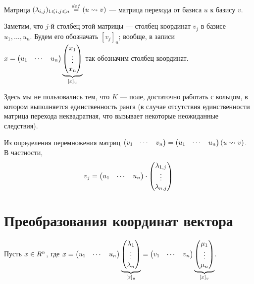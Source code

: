 \documentclass[a4paper]{report}
\begin{document}
    Матрица $(\lambda_{i,j})_{1 \leqslant i,j \leqslant n} \overset{def}{=} (u \rightsquigarrow v)$ --- матрица перехода от базиса $u$ к базису $v$.

    Заметим, что $j$-й столбец этой матрицы --- столбец координат $v_j$ в базисе $u_1, \dots, u_n$.
    Будем его обозначать $[v_j]_u$; вообще, в записи $x = \begin{pmatrix}u_1 & \cdots & u_n\end{pmatrix}\underbrace{\begin{pmatrix}x_1 \\ \vdots \\ x_n\end{pmatrix}}_{[x]_u}$ так обозначим столбец координат.

    Здесь мы не пользовались тем, что $K$ --- поле, достаточно работать с кольцом, в котором выполняется единственность ранга (в случае отсутствия единственности матрица перехода неквадратная, что вызывает некоторые неожиданные следствия).

    Из определения перемножения матриц $\begin{pmatrix}v_1 & \cdots & v_n\end{pmatrix} = \begin{pmatrix}u_1 & \cdots & u_n\end{pmatrix} (u \rightsquigarrow v)$.
    В частности, \[v_j = \begin{pmatrix}u_1 & \cdots & u_n\end{pmatrix}\cdot \begin{pmatrix}\lambda_{1, j} \\ \vdots \\ \lambda_{n,j}\end{pmatrix}\]



    \section{Преобразования координат вектора}
    Пусть $x \in \ind{}R{^n}$, где $x = \begin{pmatrix}u_1 & \cdots & u_n\end{pmatrix} \underbrace{\begin{pmatrix}\lambda_1 \\ \vdots \\ \lambda_n\end{pmatrix}}_{[x]_u} = \begin{pmatrix}v_1 & \cdots & v_n\end{pmatrix} \underbrace{\begin{pmatrix}\mu_1 \\ \vdots \\ \mu_n\end{pmatrix}}_{[x]_v}$.
\end{document}
